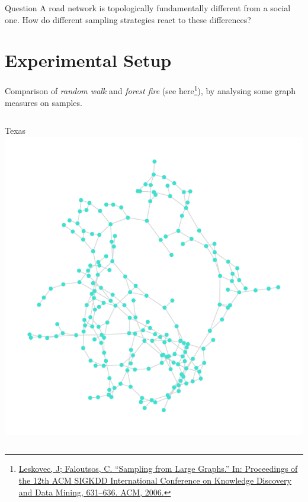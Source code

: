 \documentclass{beamer}
\begin{document}
\begin{frame}
  \begin{block}{Question}
    A road network is topologically fundamentally different from a social one.  How do different
    sampling strategies react to these differences?
  \end{block}
\end{frame}


\section{Experimental Setup}
\begin{frame}
  Comparison of \textit{random walk} and \textit{forest fire} (see
  here\footnote{\protect\href{https://cs.stanford.edu/people/jure/pubs/sampling-kdd06.pdf}{Leskovec,
      J; Faloutsos, C. \enquote{Sampling from Large Graphs.} In: Proceedings of the 12th ACM SIGKDD
      International Conference on Knowledge Discovery and Data Mining, 631--636. ACM, 2006.}}), by
  analysing some graph measures on samples.  \vspace{-0.5cm}
  \begin{columns}
    \begin{column}[t]{0.5\textwidth}
      \begin{block}{Texas}
        \centering
        \includegraphics[scale=0.3]{fig/texas_rw}\\

\end{block}
\end{column}
\end{columns}
\end{frame}
\end{document}
